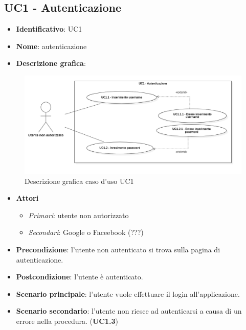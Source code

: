 
\subsection{UC1 - Autenticazione}
\begin{itemize}
  \item \textbf{Identificativo}: UC1
  \item \textbf{Nome}: autenticazione
  \item \textbf{Descrizione grafica}:
\end{itemize}

\begin{figure}[h]
  \centering
  \includegraphics[scale=1.6]{immagini/usecase/UC1.png}
  \caption{Descrizione grafica caso d'uso UC1}
\end{figure}

\begin{itemize}
  \item \textbf{Attori}
        \begin{itemize}
          \item \textit{Primari}: utente non autorizzato
          \item \textit{Secondari}: Google o Faceebook (???)
        \end{itemize}
  \item \textbf{Precondizione}: l'utente non autenticato si trova sulla pagina di autenticazione.
  \item \textbf{Postcondizione}: l'utente è autenticato.
  \item \textbf{Scenario principale}: l'utente vuole effettuare il login all'applicazione.
  \item \textbf{Scenario secondario}: l'utente non riesce ad autenticarsi a causa di un errore nella procedura. (\textbf{UC1.3})
\end{itemize}

